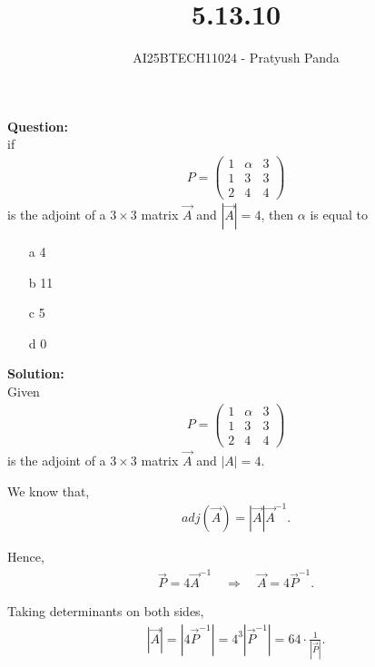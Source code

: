 \documentclass{beamer}
\title{5.13.10}
\author{AI25BTECH11024 - Pratyush Panda}
\theoremstyle{remark}
\newcommand{\myvec}[1]{\ensuremath{\begin{pmatrix}#1\end{pmatrix}}}
\numberwithin{equation}{section}
\begin{document}
\maketitle

\begin{frame}
\textbf{Question: } \\
if
\begin{align}
P = \myvec{1 & \alpha & 3 \\ 1 & 3 & 3 \\ 2 & 4 & 4}
\end{align}
is the adjoint of a $3 \times 3$ matrix $\Vec{A}$ and $|\Vec{A}|=4$, then $\alpha$ is equal to
\begin{enumerate}
\item[a] 4
\item[b] 11
\item[c] 5
\item[d] 0
\end{enumerate}
\end{frame}

\begin{frame}
\textbf{Solution: } \\
Given \\
\begin{align}
P = \myvec{1 & \alpha & 3 \\ 1 & 3 & 3 \\ 2 & 4 & 4}
\end{align}
is the adjoint of a $3 \times 3$ matrix $\Vec{A}$ and $|A| = 4$.

We know that,
\begin{align}
adj(\Vec{A}) = |\Vec{A}| \Vec{A}^{-1}.
\end{align}

Hence,
\begin{align}
\Vec{P} = 4\Vec{A}^{-1} \quad \Rightarrow \quad \Vec{A} = 4\Vec{P}^{-1}.
\end{align}

Taking determinants on both sides,
\begin{align}
|\Vec{A}| = |4\Vec{P}^{-1}| = 4^3 |\Vec{P}^{-1}| = 64 \cdot \frac{1}{|\Vec{P}|}.
\end{align}
\end{frame}
\end{document}
